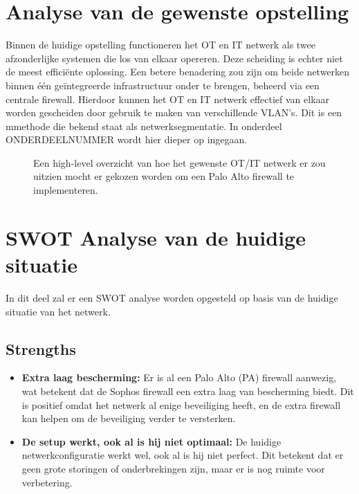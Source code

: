 \section{Analyse van de gewenste opstelling}
Binnen de huidige opstelling functioneren het OT en IT netwerk als twee afzonderlijke systemen die los van elkaar opereren. Deze scheiding is echter niet de meest efficiënte oplossing. Een betere benadering zou zijn om beide netwerken binnen één geïntegreerde infrastructuur onder te brengen, beheerd via een centrale firewall. Hierdoor kunnen het OT en IT netwerk effectief van elkaar worden gescheiden door gebruik te maken van verschillende VLAN’s. Dit is een mmethode die bekend staat als netwerksegmentatie. In onderdeel ONDERDEELNUMMER wordt hier dieper op ingegaan.

\begin{figure}[H]
    \centering
    \caption[high-level overzicht]{\label{fig:grail}Een high-level overzicht van hoe het gewenste OT/IT netwerk er zou uitzien mocht er gekozen worden om een Palo Alto firewall te implementeren.}
\end{figure}


\section{SWOT Analyse van de huidige situatie}
In dit deel zal er een SWOT analyse worden opgesteld op basis van de huidige situatie van het netwerk.


\subsection{Strengths}
\begin{itemize}
\item \textbf{Extra laag bescherming:} Er is al een Palo Alto (PA) firewall aanwezig, wat betekent dat de Sophos firewall een extra laag van bescherming biedt. Dit is positief omdat het netwerk al enige beveiliging heeft, en de extra firewall kan helpen om de beveiliging verder te versterken.

\item \textbf{De setup werkt, ook al is hij niet optimaal:} De huidige netwerkconfiguratie werkt wel, ook al is hij niet perfect. Dit betekent dat er geen grote storingen of onderbrekingen zijn, maar er is nog ruimte voor verbetering.


\end{itemize}

